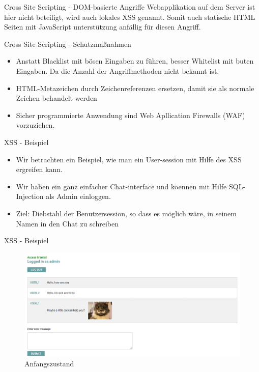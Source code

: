 \documentclass[10pt]{beamer}
\begin{document}
\begin{frame}[fragile]{Cross Site Scripting - DOM-basierte Angriffe}
  Webapplikation auf dem Server ist hier nicht beteiligt, wird auch lokales XSS genannt.
  Somit auch statische HTML Seiten mit JavaScript unterst\"utzung anf\"allig f\"ur diesen Angriff.
\end{frame}

\begin{frame}[fragile]{Cross Site Scripting - Schutzma{\ss}nahmen}
  \begin{itemize}
    \item Anstatt Blacklist mit b\"osen Eingaben zu f\"uhren, besser Whitelist mit buten Eingaben. Da die Anzahl der Angriffmethoden nicht bekannt ist.
    \item HTML-Metazeichen durch Zeichenreferenzen ersetzen, damit sie als normale Zeichen behandelt werden
    \item Sicher programmierte Anwendung sind Web Apllication Firewalls (WAF) vorzuziehen.
  \end{itemize}
\end{frame}

\begin{frame}[fragile]{XSS - Beispiel}
  \begin{itemize}
    \item Wir betrachten ein Beispiel, wie man ein User-session mit Hilfe des XSS ergreifen kann.
    \item Wir haben ein ganz einfacher Chat-interface und koennen mit Hilfe SQL-Injection als Admin einloggen.
    \item Ziel: Diebstahl der Benutzersession, so dass es m\"oglich w\"are, in seinem Namen in den Chat zu schreiben
  \end{itemize}
\end{frame}


\begin{frame}[fragile]{XSS - Beispiel}
  \begin{figure}[ht]
      \centering
      \includegraphics[width=\textwidth]{XSS-1.png}
      \caption{Anfangszustand}
      \label{fig:figure1}
  \end{figure}
\end{frame}
\end{document}
